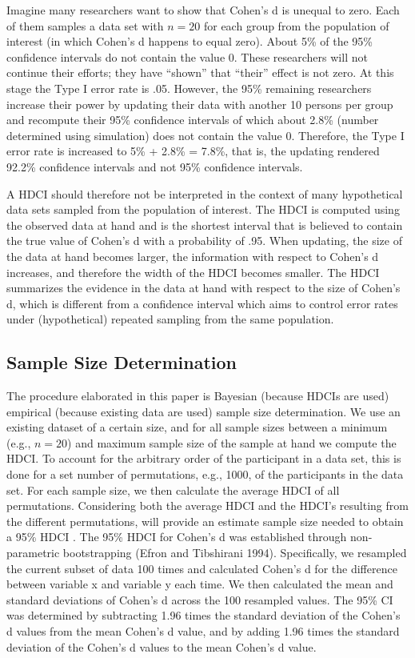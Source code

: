 \documentclass[
  letterpaper,
  DIV=11,
  numbers=noendperiod]{scrartcl}
\begin{document}
Imagine many researchers want to show that Cohen's d is unequal to zero.
Each of them samples a data set with \(n = 20\) for each group from the
population of interest (in which Cohen's d happens to equal zero). About
5\% of the 95\% confidence intervals do not contain the value 0. These
researchers will not continue their efforts; they have ``shown'' that
``their'' effect is not zero. At this stage the Type I error rate is
.05. However, the 95\% remaining researchers increase their power by
updating their data with another 10 persons per group and recompute
their 95\% confidence intervals of which about 2.8\% (number determined
using simulation) does not contain the value 0. Therefore, the Type I
error rate is increased to 5\% + 2.8\% = 7.8\%, that is, the updating
rendered 92.2\% confidence intervals and not 95\% confidence intervals.

A HDCI should therefore not be interpreted in the context of many
hypothetical data sets sampled from the population of interest. The HDCI
is computed using the observed data at hand and is the shortest interval
that is believed to contain the true value of Cohen's d with a
probability of .95. When updating, the size of the data at hand becomes
larger, the information with respect to Cohen's d increases, and
therefore the width of the HDCI becomes smaller. The HDCI summarizes the
evidence in the data at hand with respect to the size of Cohen's d,
which is different from a confidence interval which aims to control
error rates under (hypothetical) repeated sampling from the same
population.

\subsection{Sample Size Determination}\label{sample-size-determination}

The procedure elaborated in this paper is Bayesian (because HDCIs are
used) empirical (because existing data are used) sample size
determination. We use an existing dataset of a certain size, and for all
sample sizes between a minimum (e.g., \(n = 20\)) and maximum sample
size of the sample at hand we compute the HDCI. To account for the
arbitrary order of the participant in a data set, this is done for a set
number of permutations, e.g., 1000, of the participants in the data set.
For each sample size, we then calculate the average HDCI of all
permutations. Considering both the average HDCI and the HDCI's resulting
from the different permutations, will provide an estimate sample size
needed to obtain a 95\% HDCI . The 95\% HDCI for Cohen's d was
established through non-parametric bootstrapping (Efron and Tibshirani
1994). Specifically, we resampled the current subset of data 100 times
and calculated Cohen's d for the difference between variable x and
variable y each time. We then calculated the mean and standard
deviations of Cohen's d across the 100 resampled values. The 95\% CI was
determined by subtracting 1.96 times the standard deviation of the
Cohen's d values from the mean Cohen's d value, and by adding 1.96 times
the standard deviation of the Cohen's d values to the mean Cohen's d
value.
\end{document}
